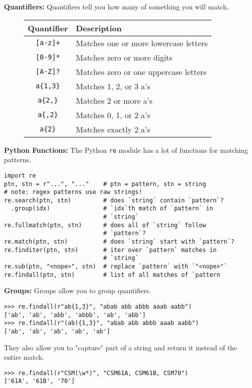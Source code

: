\textbf{Quantifiers:}
Quantifiers tell you how many of something you will match.
\begin{figure}[h]
\begin{tabular}{| c | l | } \hline
    Quantifier & Description \\ \hline
    \lstinline$[a-z]+$ & Matches one or more lowercase letters \\ \hline
    \lstinline$[0-9]*$ & Matches zero or more digits \\ \hline
    \lstinline$[A-Z]?$ & Matches zero or one uppercase letters \\ \hline
    \lstinline$a{1,3}$ & Matches 1, 2, or 3 a's \\ \hline
    \lstinline$a{2,}$ & Matches 2 or more a's \\ \hline
    \lstinline$a{,2}$ & Matches 0, 1, or 2 a's \\ \hline
    \lstinline$a{2}$ & Matches exactly 2 a's \\ \hline
\end{tabular}
\end{figure}

\newpage
\textbf{Python Functions:}
The Python \lstinline$re$ module has a lot of functions for matching patterns.

\begin{lstlisting}
import re
ptn, stn = r"...", "..."    # ptn = pattern, stn = string
# note: regex patterns use raw strings!
re.search(ptn, stn)         # does `string` contain `pattern`?
  .group(idx)               # `idx`th match of `pattern` in
                            # `string`
re.fullmatch(ptn, stn)      # does all of `string` follow
                            # `pattern`?
re.match(ptn, stn)          # does `string` start with `pattern`?
re.finditer(ptn, stn)       # iter over `pattern` matches in
                            # `string`
re.sub(ptn, "<nope>", stn)  # replace `pattern` with `"<nope>"`
re.findall(ptn, stn)        # list of all matches of `pattern
\end{lstlisting}

\textbf{Groups:}
Groups allow you to group quantifiers.
\begin{lstlisting}
>>> re.findall(r"ab{1,3}", "abab abb abbb aaab aabb")
['ab', 'ab', 'abb', 'abbb', 'ab', 'abb']
>>> re.findall(r"(ab){1,3}", "abab abb abbb aaab aabb")
['ab', 'ab', 'ab', 'ab', 'ab']
\end{lstlisting}
They also allow you to "capture" part of a string and return it instead of the entire match.
\begin{lstlisting}
>>> re.findall(r"CSM(\w*)", "CSM61A, CSM61B, CSM70")
['61A', '61B', '70']
\end{lstlisting}

